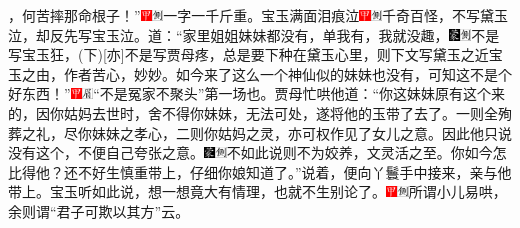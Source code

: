 {，何苦摔那命根子！”{\includegraphics[width=3mm]{../Images/00002}\includegraphics[width=3mm]{../Images/00011}\footnotesize \kaishu 一字一千斤重。}宝玉满面泪痕泣{\includegraphics[width=3mm]{../Images/00002}\includegraphics[width=3mm]{../Images/00011}\footnotesize \kaishu 千奇百怪，不写黛玉泣，却反先写宝玉泣。}道：“家里姐姐妹妹都没有，单我有，我就没趣，{\includegraphics[width=3mm]{../Images/00006}\includegraphics[width=3mm]{../Images/00011}\footnotesize \kaishu 不是写宝玉狂，{(下)}{[}亦{]}不是写贾母疼，总是要下种在黛玉心里，则下文写黛玉之近宝玉之由，作者苦心，妙妙。}如今来了这么一个神仙似的妹妹也没有，可知这不是个好东西！”{\includegraphics[width=3mm]{../Images/00002}\includegraphics[width=3mm]{../Images/00010}\footnotesize \kaishu “不是冤家不聚头”第一场也。}贾母忙哄他道：“你这妹妹原有这个来的，因你姑妈去世时，舍不得你妹妹，无法可处，遂将他的玉带了去了。一则全殉葬之礼，尽你妹妹之孝心，二则你姑妈之灵，亦可权作见了女儿之意。因此他只说没有这个，不便自己夸张之意。{\includegraphics[width=3mm]{../Images/00006}\includegraphics[width=3mm]{../Images/00011}\footnotesize \kaishu 不如此说则不为姣养，文灵活之至。}你如今怎比得他？还不好生慎重带上，仔细你娘知道了。”说着，便向丫鬟手中接来，亲与他带上。宝玉听如此说，想一想竟大有情理，也就不生别论了。{\includegraphics[width=3mm]{../Images/00002}\includegraphics[width=3mm]{../Images/00011}\footnotesize \kaishu 所谓小儿易哄，余则谓“君子可欺以其方”云。}

}

